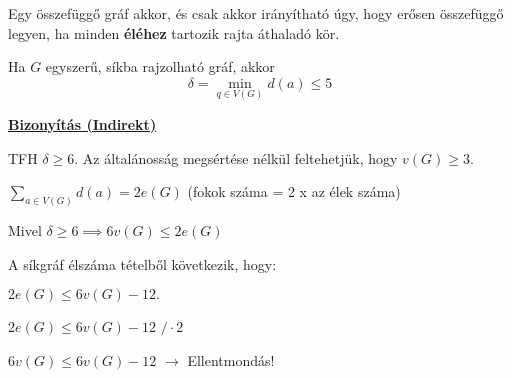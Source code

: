 \documentclass[10pt]{article}
\renewcommand{\\}{\par\noindent}
\begin{document}
\begin{frame}
\begin{tcolorbox}[title={Def.: Irányított gráf}]

\end{tcolorbox}
\end{frame}

\begin{frame}
\begin{tcolorbox}[title={Tétel: Erős összefüggőség}]
Egy összefüggő gráf akkor, és csak akkor irányítható úgy, hogy erősen összefüggő legyen, ha minden \textbf{éléhez} tartozik rajta áthaladó kör.
\end{tcolorbox}
\end{frame}

\begin{frame}
\begin{tcolorbox}[title={Tétel: Minimális fokszáma síkgráfban.}]
Ha $G$ egyszerű, síkba rajzolható gráf, akkor $$\delta = \min_{{q \in V(G)}} d(a) \leq 5$$\\
\tcblower
\smallskip
\underline{\textbf{Bizonyítás (Indirekt)}}\\
\medskip
TFH $\delta \geq 6$.
Az általánosság megsértése nélkül feltehetjük, hogy $v(G) \geq 3$.\\
$\sum_{{a \in V(G)}} d(a) = 2e(G)$ (fokok száma = 2 x az élek száma)\\
Mivel $\delta \geq 6 \implies 6v(G) \leq 2e(G)$\\
A síkgráf élszáma tételből következik, hogy:\\
$2e(G) \leq 6v(G) - 12.$\\
\bigskip
$2e(G) \leq 6v(G) - 12$ \hspace{1ex} $/\cdot2$\\
$6v(G) \leq 6v(G) - 12$ $\rightarrow$ Ellentmondás!

\end{tcolorbox}

\end{frame}
\end{document}
